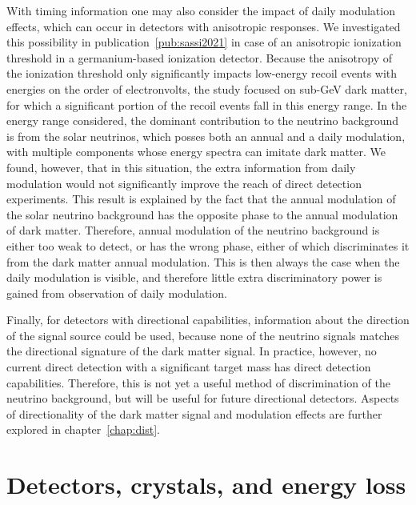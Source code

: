 \documentclass[b5paper, 10pt, twoside]{book}
\begin{document}
With timing information one may also consider the impact of daily modulation effects, which can occur in detectors with anisotropic responses. We investigated this possibility in publication~\ref{pub:sassi2021} in case of an anisotropic ionization threshold in a germanium-based ionization detector. Because the anisotropy of the ionization threshold only significantly impacts low-energy recoil events with energies on the order of electronvolts, the study focused on sub-GeV dark matter, for which a significant portion of the recoil events fall in this energy range. In the energy range considered, the dominant contribution to the neutrino background is from the solar neutrinos, which posses both an annual and a daily modulation, with multiple components whose energy spectra can imitate dark matter. We found, however, that in this situation, the extra information from daily modulation would not significantly improve the reach of direct detection experiments. This result is explained by the fact that the annual modulation of the solar neutrino background has the opposite phase to the annual modulation of dark matter. Therefore, annual modulation of the neutrino background is either too weak to detect, or has the wrong phase, either of which discriminates it from the dark matter annual modulation. This is then always the case when the daily modulation is visible, and therefore little extra discriminatory power is gained from observation of daily modulation.

Finally, for detectors with directional capabilities, information about the direction of the signal source could be used, because none of the neutrino signals matches the directional signature of the dark matter signal. In practice, however, no current direct detection with a significant target mass has direct detection capabilities. Therefore, this is not yet a useful method of discrimination of the neutrino background, but will be useful for future directional detectors. Aspects of directionality of the dark matter signal and modulation effects are further explored in chapter~\ref{chap:dist}.

\chapter{Detectors, crystals, and energy loss}
\label{chap:energy-loss}
\end{document}
